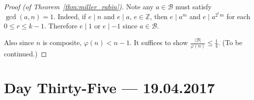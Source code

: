 \documentclass{amsbook}
\theoremstyle{plain}
\theoremstyle{definition}
\theoremstyle{remark}
\numberwithin{equation}{chapter}
\numberwithin{figure}{chapter}
\newcommand{\Z}{\mathbb{Z}}
\newcommand{\sB}{\mathcal{B}}
\begin{document}
\begin{proof}[Proof {\rm (of Theorem~\ref{thm:miller_rabin})}]\renewcommand*{\qedsymbol}{}
  Note any $a \in \sB$ must satisfy $\gcd (a, n) = 1$. Indeed, if $e \mid n$ and $e \mid a$, $e \in \Z$, then $e \mid a^m$ and $e \mid a^{2^r m}$ for each $0 \leqslant r \leqslant k - 1$. Therefore $e \mid 1$ or $e \mid -1$ since $a \in \sB$.

  Also since $n$ is composite, $\varphi (n) < n - 1$. It suffices to show $\frac{\vert \sB \vert}{\varphi (n)} \leqslant \frac{1}4$. (To be continued.)
\end{proof}

\chapter[Lecture Thirty-Five]{Day Thirty-Five \hfill {\footnotesize \rm --- 19.04.2017}}
\end{document}
